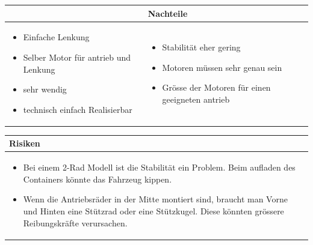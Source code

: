 \begin{table}[h]
\begin{tabular}{p{} | p{}}
\begin{table}[h]
\begin{tabular}{p{} | p{}}
 \textbf{Vorteile} & \textbf{Nachteile} \\ \hline
	 
\begin{itemize}
\item Einfache Lenkung
\item Selber Motor für antrieb und Lenkung
\item sehr wendig
\item technisch einfach Realisierbar
\end{itemize}

 
 &
 
\begin{itemize}
\item Stabilität eher gering
\item Motoren müssen sehr genau sein
\item Grösse der Motoren für einen geeigneten antrieb 
\end{itemize}

\end{tabular}
\end{table}

\begin{table}[h]
\begin{tabular}{p{}p{}}


 \textbf{Risiken} & \\ \hline
	 
\begin{itemize}
\item Bei einem 2-Rad Modell ist die Stabilität ein Problem. Beim aufladen des Containers könnte das Fahrzeug kippen.
\item Wenn die Antriebsräder in der Mitte montiert sind, braucht man Vorne und Hinten eine Stützrad oder eine Stützkugel. Diese könnten grössere Reibungskräfte verursachen.
\end{itemize}
&
\begin{itemize}

\end{itemize}

 
\end{tabular}
\end{table}

\pagebreak
